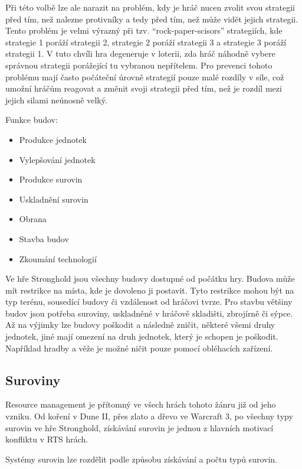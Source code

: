 Při této volbě lze ale narazit na problém, kdy je hráč nucen zvolit svou strategii před tím, než nalezne protivníky a tedy před tím, než může vidět jejich strategii. Tento problém je velmi výrazný při tzv.  ``rock-paper-scisors'' strategiích, kde strategie 1 poráží strategii 2, strategie 2 poráží strategii 3 a strategie 3 poráží strategii 1. V tuto chvíli hra degeneruje v loterii, zda hráč náhodně vybere správnou strategii porážející tu vybranou nepřítelem. Pro prevenci tohoto problému mají často  počáteční úrovně strategií pouze malé rozdíly v síle, což umožní hráčům reagovat a změnit svoji strategii před tím, než je rozdíl mezi jejich silami neúnosně velký. \cite{http://www.oxeyegames.com/rts-game-play-part-3-build-options/}

Funkce budov:
\begin{itemize}
	\item Produkce jednotek
	\item Vylepšování jednotek
	\item Produkce surovin
	\item Uskladnění surovin
	\item Obrana
	\item Stavba budov
	\item Zkoumání technologií
\end{itemize}


Ve hře Stronghold jsou všechny budovy dostupné od počátku hry. Budova může mít restrikce na místa, kde je dovoleno ji postavit. Tyto restrikce mohou být na typ terénu, sousedící budovy či vzdálenost od hráčovi tvrze. Pro stavbu většiny budov jsou potřeba suroviny, uskladněné v hráčově skladišti, zbrojírně či sýpce. Až na výjimky lze budovy poškodit a následně zničit, některé všemi druhy jednotek, jiné mají omezení na druh jednotek, který je schopen je poškodit. Například hradby a věže je možné ničit pouze pomocí obléhacích zařízení. 

\subsection{Suroviny}
Resource management je přítomný ve všech hrách tohoto žánru již od jeho vzniku. Od koření v Dune II, přes zlato a dřevo ve Warcraft 3, po všechny typy surovin ve hře Stronghold, získávání surovin je jednou z hlavních motivací konfliktu v RTS hrách. 

Systémy surovin lze rozdělit podle způsobu získávání a počtu typů surovin.

